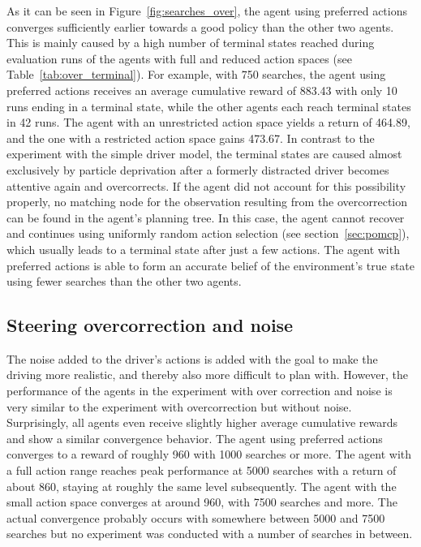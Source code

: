   

As it can be seen in Figure~\ref{fig:searches_over}, the agent using preferred actions converges sufficiently earlier towards a good policy than the other two agents. This is mainly caused by a high number of terminal states reached during evaluation runs of the agents with full and reduced action spaces (see Table~\ref{tab:over_terminal}). For example, with 750 searches, the agent using preferred actions receives an average cumulative reward of 883.43 with only 10 runs ending in a terminal state, while the other agents each reach terminal states in 42 runs. The agent with an unrestricted action space yields a return of 464.89, and the one with a restricted action space gains 473.67. In contrast to the experiment with the simple driver model, the terminal states are caused almost exclusively by particle deprivation after a formerly distracted driver becomes attentive again and overcorrects. If the agent did not account for this possibility properly, no matching node for the observation resulting from the overcorrection can be found in the agent's planning tree. In this case, the agent cannot recover and continues using uniformly random action selection (see section~\ref{sec:pomcp}), which usually leads to a terminal state after just a few actions. The agent with preferred actions is able to form an accurate belief of the environment's true state using fewer searches than the other two agents.


\subsection{Steering overcorrection and noise}

The noise added to the driver's actions is added with the goal to make the driving more realistic, and thereby also more difficult to plan with. However, the performance of the agents in the experiment with over correction and noise is very similar to the experiment with overcorrection but without noise. Surprisingly, all agents even receive slightly higher average cumulative rewards and show a similar convergence behavior. The agent using preferred actions converges to a reward of roughly 960 with 1000 searches or more. The agent with a full action range reaches peak performance at 5000 searches with a return of about 860, staying at roughly the same level subsequently. The agent with the small action space converges at around 960, with 7500 searches and more. The actual convergence probably occurs with somewhere between 5000 and 7500 searches but no experiment was conducted with a number of searches in between.

